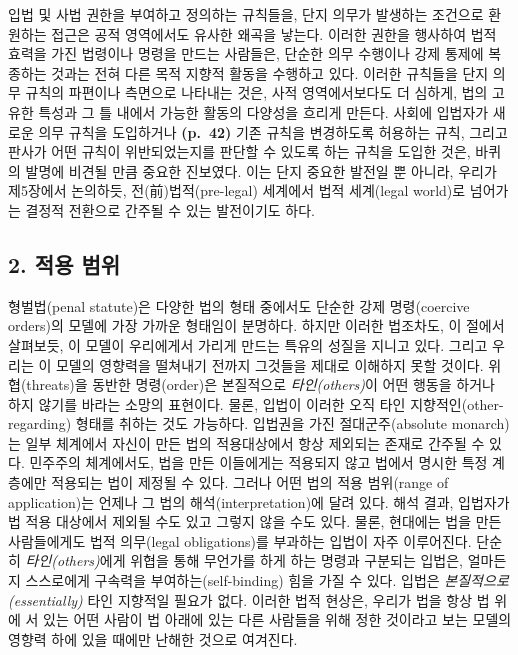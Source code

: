 \documentclass[12pt, oneside]{book}  %
\begin{document}
입법 및 사법 권한을 부여하고 정의하는 규칙들을, 단지 의무가 발생하는
조건으로 환원하는 접근은 공적 영역에서도 유사한 왜곡을 낳는다. 이러한
권한을 행사하여 법적 효력을 가진 법령이나 명령을 만드는 사람들은, 단순한
의무 수행이나 강제 통제에 복종하는 것과는 전혀 다른 목적 지향적 활동을
수행하고 있다. 이러한 규칙들을 단지 의무 규칙의 파편이나 측면으로
나타내는 것은, 사적 영역에서보다도 더 심하게, 법의 고유한 특성과 그 틀
내에서 가능한 활동의 다양성을 흐리게 만든다. 사회에 입법자가 새로운 의무
규칙을 도입하거나 \textbf{(p.~42)} 기존 규칙을 변경하도록 허용하는 규칙,
그리고 판사가 어떤 규칙이 위반되었는지를 판단할 수 있도록 하는 규칙을
도입한 것은, 바퀴의 발명에 비견될 만큼 중요한 진보였다. 이는 단지 중요한
발전일 뿐 아니라, 우리가 제5장에서 논의하듯, 전(前)법적(pre-legal)
세계에서 법적 세계(legal world)로 넘어가는 결정적 전환으로 간주될 수
있는 발전이기도 하다.

\subsection{\texorpdfstring{\textbf{2. 적용
범위}}{2. 적용 범위}}\label{uxc801uxc6a9-uxbc94uxc704}

형벌법(penal statute)은 다양한 법의 형태 중에서도 단순한 강제
명령(coercive orders)의 모델에 가장 가까운 형태임이 분명하다. 하지만
이러한 법조차도, 이 절에서 살펴보듯, 이 모델이 우리에게서 가리게 만드는
특유의 성질을 지니고 있다. 그리고 우리는 이 모델의 영향력을 떨쳐내기
전까지 그것들을 제대로 이해하지 못할 것이다. 위협(threats)을 동반한
명령(order)은 본질적으로 \emph{타인(others)}이 어떤 행동을 하거나 하지
않기를 바라는 소망의 표현이다. 물론, 입법이 이러한 오직 타인
지향적인(other-regarding) 형태를 취하는 것도 가능하다. 입법권을 가진
절대군주(absolute monarch)는 일부 체계에서 자신이 만든 법의 적용대상에서
항상 제외되는 존재로 간주될 수 있다. 민주주의 체계에서도, 법을 만든
이들에게는 적용되지 않고 법에서 명시한 특정 계층에만 적용되는 법이
제정될 수 있다. 그러나 어떤 법의 적용 범위(range of application)는
언제나 그 법의 해석(interpretation)에 달려 있다. 해석 결과, 입법자가 법
적용 대상에서 제외될 수도 있고 그렇지 않을 수도 있다. 물론, 현대에는
법을 만든 사람들에게도 법적 의무(legal obligations)를 부과하는 입법이
자주 이루어진다. 단순히 \emph{타인(others)}에게 위협을 통해 무언가를
하게 하는 명령과 구분되는 입법은, 얼마든지 스스로에게 구속력을
부여하는(self-binding) 힘을 가질 수 있다. 입법은
\emph{본질적으로(essentially)} 타인 지향적일 필요가 없다. 이러한 법적
현상은, 우리가 법을 항상 법 위에 서 있는 어떤 사람이 법 아래에 있는 다른
사람들을 위해 정한 것이라고 보는 모델의 영향력 하에 있을 때에만 난해한
것으로 여겨진다.
\end{document}
